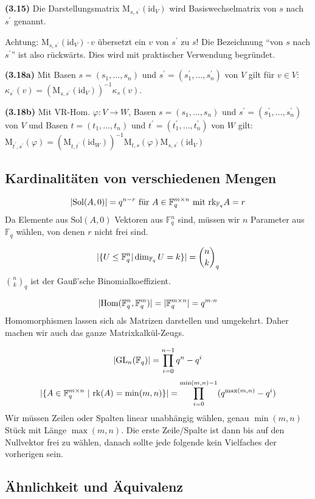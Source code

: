 \documentclass[a4paper,parskip=half*,DIV=15,fontsize=11pt]{scrartcl}
\newlength{\hangwidth}
\newcommand{\skript}[1]{\settowidth{\hangwidth}{\textbf{(#1)} }\hangpara{\hangwidth}{1}\textbf{(#1)} \ignorespaces} %
\newcommand{\id}{\mathrm{id}} %
\newcommand{\Sol}{\mathrm{Sol}} %
\newcommand{\rk}{\mathrm{rk}} %
\newcommand{\GL}{\mathrm{GL}} %
\newcommand{\Field}{\mathbb{F}} %
\DeclarePairedDelimiter\abs{\lvert}{\rvert} %
\begin{document}
\skript{3.15} Die Darstellungsmatrix $\mathrm{M}_{s, s^\prime}(\id_V)$ wird Basiswechselmatrix von $s$ nach $s^\prime$ genannt.

Achtung: $\mathrm{M}_{s, s^\prime}(\id_V) \cdot v$ übersetzt ein $v$ von $s^\prime$ zu $s$! Die Bezeichnung ``von $s$ nach $s^\prime$'' ist also rückwärts. Dies wird mit praktischer Verwendung begründet.

\skript{3.18a} Mit Basen $s = (s_1,\ldots, s_n)$ und $s^\prime = (s^\prime_1, \ldots, s^\prime_n)$ von $V$ gilt für $v \in V$:\\ $\kappa_{s^\prime}(v) = (\mathrm{M}_{s,s^\prime}(\id_V))^{-1} \kappa_s(v)$.

\skript{3.18b} Mit VR-Hom. $\varphi : V \to W$, Basen $s = (s_1,\ldots, s_n)$ und $s^\prime = (s^\prime_1, \ldots, s^\prime_n)$ von $V$ und Basen $t = (t_1,\ldots, t_n)$ und $t^\prime = (t^\prime_1, \ldots, t^\prime_n)$ von $W$ gilt: \\
$\mathrm{M}_{t^\prime, s^\prime}(\varphi) = (\mathrm{M}_{t,t^\prime}(\id_W))^{-1} \mathrm{M}_{t,s}(\varphi) \mathrm{M}_{s,s^\prime}(\id_V)$

\subsection{Kardinalitäten von verschiedenen Mengen}

$$\abs{\Sol(A,0)} = q^{n-r} \text{ für } A \in \Field_q^{m \times n} \text{ mit } \rk_{\Field_q} A = r$$
Da Elemente aus $\Sol(A,0)$ Vektoren aus $\Field_q^n$ sind, müssen wir $n$ Parameter aus $\Field_q$ wählen, von denen $r$ nicht frei sind.

$$\abs{\{ U \leq \Field_q^n | \dim_{\Field_q} U = k \}} = \binom{n}{k}_q$$
$\binom{n}{k}_q$ ist der Gauß'sche Binomialkoeffizient.

$$\abs{\mathrm{Hom}(\Field_q^n,\Field_q^m)} = \abs{\Field_q^{m \times n}} = q^{m \cdot n}$$
Homomorphismen lassen sich als Matrizen darstellen und umgekehrt. Daher machen wir auch das ganze Matrixkalkül-Zeugs.

$$\abs{\GL_n(\Field_q)} = \prod_{i=0}^{n-1} q^n-q^i$$
$$\abs{\{A \in \Field_q^{m \times n} ~ | ~ \rk(A) = \min(m,n)\}} = \prod_{i=0}^{\min(m,n)-1} (q^{\max(m,n)}-q^i)$$
Wir müssen Zeilen oder Spalten linear unabhängig wählen, genau $\min(m,n)$ Stück mit Länge $\max(m,n)$. Die erste Zeile/Spalte ist dann bis auf den Nullvektor frei zu wählen, danach sollte jede folgende kein Vielfaches der vorherigen sein.

\subsection{Ähnlichkeit und Äquivalenz}
\end{document}
